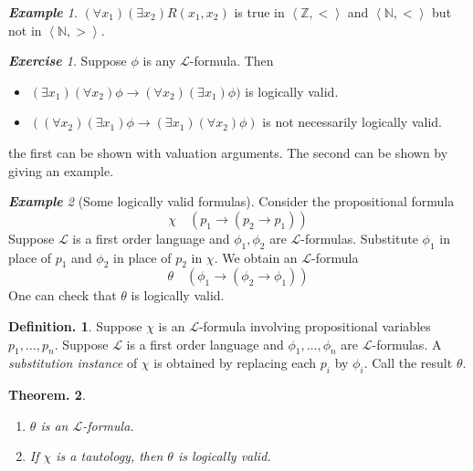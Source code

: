 \documentclass[a4paper,oneside,11pt,DIV=12,parskip=half]{scrartcl}
\newcommand{\N}{\mathbb N}
\newcommand{\LL}{\mathcal L}
\newcommand{\skal}[1]{\left \langle #1 \right\rangle}
\theoremstyle{plain}
\newtheorem{theorem}{Theorem.}[section]
\theoremstyle{definition}
\newtheorem{definition}[theorem]{Definition.}
\newtheorem{remark, definition}[theorem]{Remark and Definition.}
\newtheorem{lemma, definition}[theorem]{Lemma and Definition.}
\newtheorem{theorem, definition}[theorem]{Theorem and Definition.}
\theoremstyle{remark}
\newtheorem*{exercise}{\textbf{Exercise}}
\newtheorem*{example}{\textbf{Example}}
\newtheorem*{remark, example}{\textbf{Remark and Exercise}}
\begin{document}
\begin{example}
    $(\forall x_1)(\exists x_2) R(x_1,x_2)$ is true in $\skal{\mathbb{Z},<}$ and $\skal{\N,<}$ but not in $\skal{\N,>}$.
\end{example}

\begin{exercise}
    Suppose $\phi$ is any $\LL$-formula. Then
    \begin{itemize}
        \item $(\exists x_1)(\forall x_2) \phi \rightarrow (\forall x_2)(\exists x_1)\phi) $ is logically valid.
        \item $((\forall x_2)(\exists x_1) \phi \rightarrow (\exists x_1)(\forall x_2)\phi)$ is not necessarily logically valid.
    \end{itemize}
    the first can be shown with valuation arguments. The second can be shown by giving an example.
\end{exercise}

\begin{example}[Some logically valid formulas]
Consider the propositional formula 
    \[ \chi \quad (p_1 \rightarrow (p_2 \rightarrow p_1)) \]
    Suppose $\LL$ is a first order language and $\phi_1, \phi_2$ are $\LL$-formulas. Substitute $\phi_1$ in place of $p_1$ and $\phi_2$ in place of $p_2$ in $\chi$. We obtain an $\LL$-formula 
    \[ \theta \quad (\phi_1 \rightarrow (\phi_2 \rightarrow \phi_1)) \]
    One can check that $\theta$ is logically valid.
    
\end{example}

\begin{definition}
 Suppose $\chi$ is an $\LL$-formula involving propositional variables $p_1,\dots ,p_n$. Suppose $\LL$ is a first order language and $\phi_1,\dots,\phi_n$ are $\LL$-formulas. A \emph{substitution instance} of $\chi$ is obtained by replacing each $p_i$ by $\phi_i$. Call the result $\theta$.   
\end{definition}

\begin{theorem}
\begin{enumerate}
    \item $\theta$ is an $\LL$-formula.
    \item If $\chi$ is a tautology, then $\theta$ is logically valid.
\end{enumerate}
\end{theorem}
\end{document}
